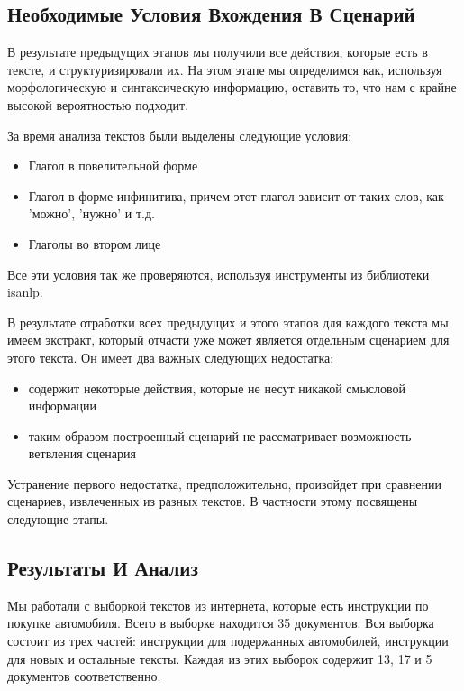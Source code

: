 \documentclass[12pt]{article}
\begin{document}

\subsection{Необходимые Условия Вхождения В Сценарий}
\label{marker4}

В результате предыдущих этапов мы получили все действия, которые есть в тексте, и структуризировали их. На этом этапе мы определимся как, используя морфологическую и синтаксическую информацию, оставить то, что нам с крайне высокой вероятностью подходит.

За время анализа текстов были выделены следующие условия:

\begin{itemize}
	\item Глагол в повелительной форме
	\item Глагол в форме инфинитива, причем этот глагол зависит от таких слов, как 'можно', 'нужно' и т.д.
	\item Глаголы во втором лице
\end{itemize}

Все эти условия так же проверяются, используя инструменты из библиотеки isanlp.

В результате отработки всех предыдущих и этого этапов для каждого текста мы имеем экстракт, который отчасти уже может является отдельным сценарием для этого текста. Он имеет два важных следующих недостатка:
\begin{itemize}
	\item содержит некоторые действия, которые не несут никакой смысловой информации
	\item таким образом построенный сценарий не рассматривает возможность ветвления сценария
\end{itemize}

Устранение первого недостатка, предположительно, произойдет при сравнении сценариев, извлеченных из разных текстов. В частности этому посвящены следующие этапы.

\subsection{Результаты И Анализ}
\label{marker7}

Мы работали с выборкой текстов из интернета, которые есть инструкции по покупке автомобиля. Всего в выборке находится 35 документов. Вся выборка состоит из трех частей: инструкции для подержанных автомобилей, инструкции для новых и остальные тексты. Каждая из этих выборок содержит 13, 17 и 5 документов соответственно.
\end{document}
